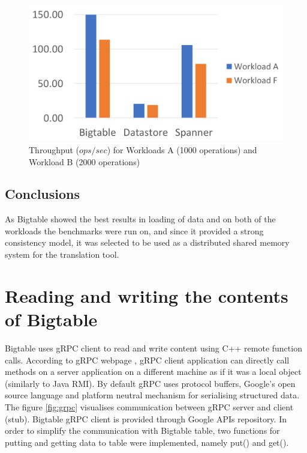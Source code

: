 \documentclass[bsc,frontabs,twoside,singlespacing,parskip,deptreport]{infthesis}     %
\begin{document}
\begin{figure}[!ht]
	\centering
	\includegraphics[width=12cm]{throughput}
	\caption{Throughput (\(ops/sec\)) for Workloads A (1000 operations) and Workload B (2000 operations)}
	\label{throughput}
\end{figure}

\subsection{Conclusions}

As Bigtable showed the best results in loading of data and on both of the workloads the benchmarks were run on, and since it provided a strong consistency model, it was selected to be used as a distributed shared memory system for the translation tool.

\section{Reading and writing the contents of Bigtable}

Bigtable uses gRPC client to read and write content using C++ remote function calls. According to gRPC webpage \citep{grpc}, gRPC client application can directly call methods on a server application on a different machine as if it was a local object (similarly to Java RMI). By default gRPC uses protocol buffers, Google's open source language and platform neutral mechanism for serialising structured data. The figure \ref{fig:grpc} visualises communication between gRPC server and client (stub). Bigtable gRPC client is provided through Google APIs repository. In order to simplify the communication with Bigtable table, two functions for putting and getting data to table were implemented, namely put() and get().
\end{document}
